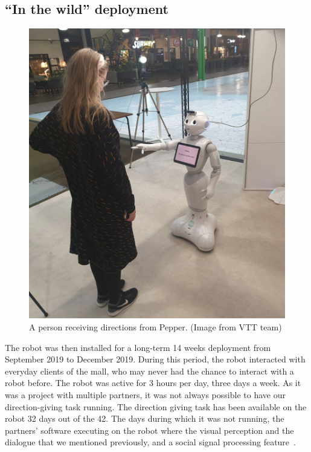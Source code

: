 \documentclass[a4paper,11pt,twoside]{StyleThese}
\begin{document}
\subsection{``In the wild'' deployment}\label{subsec:deploy}
\begin{figure}
	\centering
	\includegraphics[width=\linewidth]{figures/chapter3/guided_person.jpg}
	\caption{A person receiving directions from Pepper. (Image from VTT team)}
	\label{fig:guided_person}
\end{figure}
The robot was then installed for a long-term 14 weeks deployment from September 2019 to December 2019. During this period, the robot interacted with everyday clients of the mall, who may never had the chance to interact with a robot before. The robot was active for 3 hours per day, three days a week. As it was a project with multiple partners, it was not always possible to have our direction-giving task running. The direction giving task has been available on the robot 32 days out of the 42. The days during which it was not running, the partners' software executing on the robot where the visual perception and the dialogue that we mentioned previously, and a social signal processing feature~\cite{foster2019mummer}.
\end{document}
